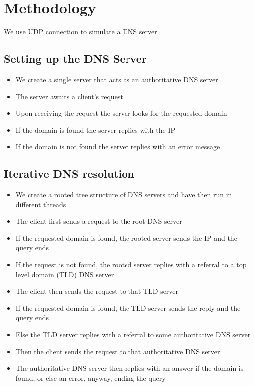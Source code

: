 \documentclass[11pt]{article}
\begin{document}
\section{Methodology}
We use UDP connection to simulate a DNS server
    \subsection{Setting up the DNS Server}
        \begin{itemize}
            \item We create a single server that acts as an authoritative DNS server
            \item The server awaits a client's request
            \item Upon receiving the request the server looks for the requested domain
            \item If the domain is found the server replies with the IP
            \item If the domain is not found the server replies with an error message
        \end{itemize}
    \subsection{Iterative DNS resolution}
        \begin{itemize}
            \item We create a rooted tree structure of DNS servers and have then run in different threads
            \item The client first sends a request to the root DNS server
            \item If the requested domain is found, the rooted server sends the IP and the query ends
            \item If the request is not found, the rooted server replies with a referral to a top level domain (TLD) DNS server
            \item The client then sends the request to that TLD server
            \item If the requested domain is found, the TLD server sends the reply and the query ends
            \item Else the TLD server replies with a referral to some authoritative DNS server
            \item Then the client sends the request to that authoritative DNS server
            \item The authoritative DNS server then replies with an answer if the domain is found, or else an error, anyway, ending the query
        \end{itemize}
\end{document}
